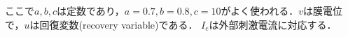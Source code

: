 ここで$a,b,c$は定数であり，$a=0.7, b=0.8, c=10$がよく使われる．$v$は膜電位で，$u$は回復変数(recovery variable)である． $I_e$は外部刺激電流に対応する．